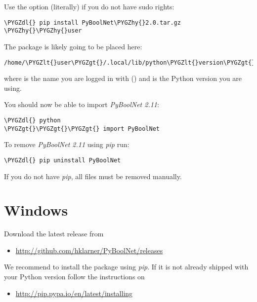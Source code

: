 \documentclass[letterpaper,10pt,english]{sphinxmanual}
\def\PYGZlt{\char`\<}
\def\PYGZgt{\char`\>}
\def\PYGZdl{\char`\$}
\def\PYGZhy{\char`\-}
\begin{document}
Use the option  (literally) if you do not have sudo rights:

\begin{Verbatim}[commandchars=\\\{\}]
\PYGZdl{} pip install PyBoolNet\PYGZhy{}2.0.tar.gz \PYGZhy{}\PYGZhy{}user
\end{Verbatim}

The package is likely going to be placed here:

\begin{Verbatim}[commandchars=\\\{\}]
/home/\PYGZlt{}user\PYGZgt{}/.local/lib/python\PYGZlt{}version\PYGZgt{}/dist\PYGZhy{}packages/PyBoolNet
\end{Verbatim}

where  is the name you are logged in with () and  is the Python version you are using.

You should now be able to import \emph{PyBoolNet 2.11}:

\begin{Verbatim}[commandchars=\\\{\}]
\PYGZdl{} python
\PYGZgt{}\PYGZgt{}\PYGZgt{} import PyBoolNet
\end{Verbatim}

To remove \emph{PyBoolNet 2.11} using \emph{pip} run:

\begin{Verbatim}[commandchars=\\\{\}]
\PYGZdl{} pip uninstall PyBoolNet
\end{Verbatim}

If you do not have \emph{pip}, all files must be removed manually.


\section{Windows}
\label{Installation:windows}
Download the latest release from
\begin{itemize}
\item {} 
\href{http://github.com/hklarner/PyBoolNet/releases}{http://github.com/hklarner/PyBoolNet/releases}

\end{itemize}

We recommend to install the package using \emph{pip}. If it is not already shipped with your Python version follow the instructions
on
\begin{itemize}
\item {} 
\href{http://pip.pypa.io/en/latest/installing}{http://pip.pypa.io/en/latest/installing}

\end{itemize}
\end{document}
